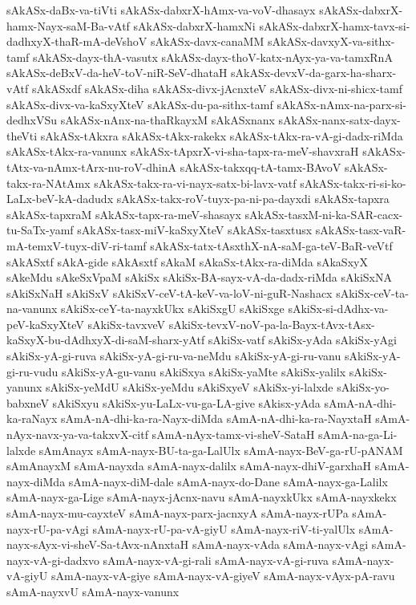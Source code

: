{sAkASx-daBx-va-tiVti
sAkASx-dabxrX-hAmx-va-voV-dhasayx
sAkASx-dabxrX-hamx-Nayx-saM-Ba-vAtf
sAkASx-dabxrX-hamxNi
sAkASx-dabxrX-hamx-tavx-si-dadhxyX-thaR-mA-deVshoV
sAkASx-davx-canaMM
sAkASx-davxyX-va-sithx-tamf
sAkASx-dayx-thA-vasutx
sAkASx-dayx-thoV-katx-nAyx-ya-va-tamxRnA
sAkASx-deBxV-da-heV-toV-niR-SeV-dhataH
sAkASx-devxV-da-garx-ha-sharx-vAtf
sAkASxdf
sAkASx-diha
sAkASx-divx-jAcnxteV
sAkASx-divx-ni-shicx-tamf
sAkASx-divx-va-kaSxyXteV
sAkASx-du-pa-sithx-tamf
sAkASx-nAmx-na-parx-si-dedhxVSu
sAkASx-nAnx-na-thaRkayxM
sAkASxnanx
sAkASx-nanx-satx-dayx-theVti
sAkASx-tAkxra
sAkASx-tAkx-rakekx
sAkASx-tAkx-ra-vA-gi-dadx-riMda
sAkASx-tAkx-ra-vanunx
sAkASx-tApxrX-vi-sha-tapx-ra-meV-shavxraH
sAkASx-tAtx-va-nAmx-tArx-nu-roV-dhinA
sAkASx-takxqq-tA-tamx-BAvoV
sAkASx-takx-ra-NAtAmx
sAkASx-takx-ra-vi-nayx-satx-bi-lavx-vatf
sAkASx-takx-ri-si-ko-LaLx-beV-kA-dadudx
sAkASx-takx-roV-tuyx-pa-ni-pa-dayxdi
sAkASx-tapxra
sAkASx-tapxraM
sAkASx-tapx-ra-meV-shasayx
sAkASx-tasxM-ni-ka-SAR-cacx-tu-SaTx-yamf
sAkASx-tasx-miV-kaSxyXteV
sAkASx-tasxtusx
sAkASx-tasx-vaR-mA-temxV-tuyx-diV-ri-tamf
sAkASx-tatx-tAsxthX-nA-saM-ga-teV-BaR-veVtf
sAkASxtf
sAkA-gide
sAkAsxtf
sAkaM
sAkaSx-tAkx-ra-diMda
sAkaSxyX
sAkeMdu
sAkeSxVpaM
sAkiSx
sAkiSx-BA-sayx-vA-da-dadx-riMda
sAkiSxNA
sAkiSxNaH
sAkiSxV
sAkiSxV-ceV-tA-keV-va-loV-ni-guR-Nashacx
sAkiSx-ceV-ta-na-vanunx
sAkiSx-ceY-ta-nayxkUkx
sAkiSxgU
sAkiSxge
sAkiSx-si-dAdhx-va-peV-kaSxyXteV
sAkiSx-tavxveV
sAkiSx-tevxV-noV-pa-la-Bayx-tAvx-tAsx-kaSxyX-bu-dAdhxyX-di-saM-sharx-yAtf
sAkiSx-vatf
sAkiSx-yAda
sAkiSx-yAgi
sAkiSx-yA-gi-ruva
sAkiSx-yA-gi-ru-va-neMdu
sAkiSx-yA-gi-ru-vanu
sAkiSx-yA-gi-ru-vudu
sAkiSx-yA-gu-vanu
sAkiSxya
sAkiSx-yaMte
sAkiSx-yalilx
sAkiSx-yanunx
sAkiSx-yeMdU
sAkiSx-yeMdu
sAkiSxyeV
sAkiSx-yi-lalxde
sAkiSx-yo-babxneV
sAkiSxyu
sAkiSx-yu-LaLx-vu-ga-LA-give
sAkisx-yAda
sAmA-nA-dhi-ka-raNayx
sAmA-nA-dhi-ka-ra-Nayx-diMda
sAmA-nA-dhi-ka-ra-NayxtaH
sAmA-nAyx-navx-ya-va-takxvX-citf
sAmA-nAyx-tamx-vi-sheV-SataH
sAmA-na-ga-Li-lalxde
sAmAnayx
sAmA-nayx-BU-ta-ga-LalUlx
sAmA-nayx-BeV-ga-rU-pANAM
sAmAnayxM
sAmA-nayxda
sAmA-nayx-dalilx
sAmA-nayx-dhiV-garxhaH
sAmA-nayx-diMda
sAmA-nayx-diM-dale
sAmA-nayx-do-Dane
sAmA-nayx-ga-Lalilx
sAmA-nayx-ga-Lige
sAmA-nayx-jAcnx-navu
sAmA-nayxkUkx
sAmA-nayxkekx
sAmA-nayx-mu-cayxteV
sAmA-nayx-parx-jacnxyA
sAmA-nayx-rUPa
sAmA-nayx-rU-pa-vAgi
sAmA-nayx-rU-pa-vA-giyU
sAmA-nayx-riV-ti-yalUlx
sAmA-nayx-sAyx-vi-sheV-Sa-tAvx-nAnxtaH
sAmA-nayx-vAda
sAmA-nayx-vAgi
sAmA-nayx-vA-gi-dadxvo
sAmA-nayx-vA-gi-rali
sAmA-nayx-vA-gi-ruva
sAmA-nayx-vA-giyU
sAmA-nayx-vA-giye
sAmA-nayx-vA-giyeV
sAmA-nayx-vAyx-pA-ravu
sAmA-nayxvU
sAmA-nayx-vanunx
}
